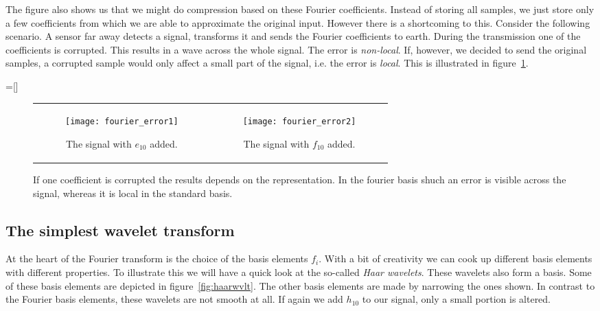 The figure also shows us that we might do compression based on these Fourier coefficients. Instead of storing all samples, we just store only a few coefficients from which we are able to approximate the original input. However there is a shortcoming to this. Consider the following scenario. A sensor far away detects a signal, transforms it and sends the Fourier coefficients to earth. During the transmission one of the coefficients is corrupted. This results in a wave across the whole signal. The error is \emph{non-local}. If, however, we decided to send the original samples, a corrupted sample would only affect a small part of the signal, i.e. the error is \emph{local}. This is illustrated in figure~\ref{fig:fourier_error}.

=[]
\begin{figure}
	\begin{tabular}{c|c}
	\begin{subfigure}[b]{0.5\textwidth}
		\centering
		\texttt{[image: fourier\_error1]}
		\caption{The signal with $e_{10}$ added.}
	\end{subfigure}&
	\begin{subfigure}[b]{0.5\textwidth}
		\centering
		\texttt{[image: fourier\_error2]}
		\caption{The signal with $f_{10}$ added.}
	\end{subfigure}
	\end{tabular}
	\caption{If one coefficient is corrupted the results depends on the representation. In the fourier basis shuch an error is visible across the signal, whereas it is local in the standard basis.}
	\label{fig:fourier_error}
\end{figure}


\subsection{The simplest wavelet transform}
At the heart of the Fourier transform is the choice of the basis elements $f_i$. With a bit of creativity we can cook up different basis elements with different properties. To illustrate this we will have a quick look at the so-called \emph{Haar wavelets}. These wavelets also form a basis. Some of these basis elements are depicted in figure~\ref{fig:haarwvlt}. The other basis elements are made by narrowing the ones shown. In contrast to the Fourier basis elements, these wavelets are not smooth at all. If again we add $h_{10}$ to our signal, only a small portion is altered.

